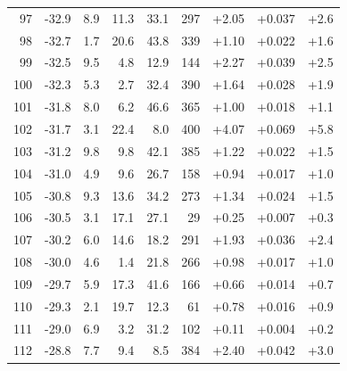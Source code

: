 \begin{longtable}{@{}r r r r r r r r r@{}}
97 & -32.9 & 8.9 & 11.3 & 33.1 & 297 & \cellcolor{green!32}+2.05 & \cellcolor{yellow!32}+0.037 & \cellcolor{orange!27}+2.6 \\
98 & -32.7 & 1.7 & 20.6 & 43.8 & 339 & \cellcolor{green!24}+1.10 & \cellcolor{yellow!25}+0.022 & \cellcolor{orange!23}+1.6 \\
99 & -32.5 & 9.5 & 4.8 & 12.9 & 144 & \cellcolor{green!33}+2.27 & \cellcolor{yellow!33}+0.039 & \cellcolor{orange!27}+2.5 \\
100 & -32.3 & 5.3 & 2.7 & 32.4 & 390 & \cellcolor{green!28}+1.64 & \cellcolor{yellow!28}+0.028 & \cellcolor{orange!24}+1.9 \\
101 & -31.8 & 8.0 & 6.2 & 46.6 & 365 & \cellcolor{green!23}+1.00 & \cellcolor{yellow!23}+0.018 & \cellcolor{orange!21}+1.1 \\
102 & -31.7 & 3.1 & 22.4 & 8.0 & 400 & \cellcolor{green!47}+4.07 & \cellcolor{yellow!48}+0.069 & \cellcolor{orange!43}+5.8 \\
103 & -31.2 & 9.8 & 9.8 & 42.1 & 385 & \cellcolor{green!25}+1.22 & \cellcolor{yellow!25}+0.022 & \cellcolor{orange!22}+1.5 \\
104 & -31.0 & 4.9 & 9.6 & 26.7 & 158 & \cellcolor{green!23}+0.94 & \cellcolor{yellow!23}+0.017 & \cellcolor{orange!20}+1.0 \\
105 & -30.8 & 9.3 & 13.6 & 34.2 & 273 & \cellcolor{green!26}+1.34 & \cellcolor{yellow!26}+0.024 & \cellcolor{orange!22}+1.5 \\
106 & -30.5 & 3.1 & 17.1 & 27.1 & 29 & \cellcolor{green!18}+0.25 & \cellcolor{yellow!17}+0.007 & \cellcolor{orange!17}+0.3 \\
107 & -30.2 & 6.0 & 14.6 & 18.2 & 291 & \cellcolor{green!31}+1.93 & \cellcolor{yellow!31}+0.036 & \cellcolor{orange!27}+2.4 \\
108 & -30.0 & 4.6 & 1.4 & 21.8 & 266 & \cellcolor{green!23}+0.98 & \cellcolor{yellow!22}+0.017 & \cellcolor{orange!20}+1.0 \\
109 & -29.7 & 5.9 & 17.3 & 41.6 & 166 & \cellcolor{green!21}+0.66 & \cellcolor{yellow!21}+0.014 & \cellcolor{orange!19}+0.7 \\
110 & -29.3 & 2.1 & 19.7 & 12.3 & 61 & \cellcolor{green!22}+0.78 & \cellcolor{yellow!22}+0.016 & \cellcolor{orange!19}+0.9 \\
111 & -29.0 & 6.9 & 3.2 & 31.2 & 102 & \cellcolor{green!16}+0.11 & \cellcolor{yellow!16}+0.004 & \cellcolor{orange!16}+0.2 \\
112 & -28.8 & 7.7 & 9.4 & 8.5 & 384 & \cellcolor{green!34}+2.40 & \cellcolor{yellow!34}+0.042 & \cellcolor{orange!30}+3.0 \\

\end{longtable}
